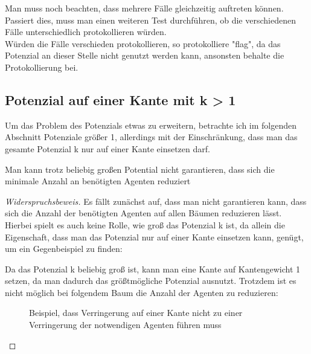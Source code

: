Man muss noch beachten, dass mehrere Fälle gleichzeitig auftreten können. Passiert dies, muss man einen weiteren Test durchführen, ob die verschiedenen Fälle unterschiedlich protokollieren würden.
\\
Würden die Fälle verschieden protokollieren, so protokolliere "flag", da das Potenzial an dieser Stelle nicht genutzt werden kann, ansonsten behalte die Protokollierung bei.

\subsection{Potenzial auf einer Kante mit k > 1}

Um das Problem des Potenzials etwas zu erweitern, betrachte ich im folgenden Abschnitt Potenziale größer 1, allerdings mit der Einschränkung, dass man das gesamte Potenzial k nur auf einer Kante einsetzen darf.

\begin{theorem}
	Man kann trotz beliebig großen Potential nicht garantieren, dass sich die minimale Anzahl an benötigten Agenten reduziert
\end{theorem}

\begin{proof}[Widerspruchsbeweis]
	Es fällt zunächst auf, dass man nicht garantieren kann, dass sich die Anzahl der benötigten Agenten auf allen Bäumen reduzieren lässt. Hierbei spielt es auch keine Rolle, wie groß das Potenzial k ist, da allein die Eigenschaft, dass man das Potenzial nur auf einer Kante einsetzen kann, genügt, um ein Gegenbeispiel zu finden:
	
	Da das Potenzial k beliebig groß ist, kann man eine Kante auf Kantengewicht 1 setzen, da man dadurch das größtmögliche Potenzial ausnutzt. Trotzdem ist es nicht möglich bei folgendem Baum die Anzahl der Agenten zu reduzieren:
	
	\begin{figure}[h]
		\hfill
		\caption{Beispiel, dass Verringerung auf einer Kante nicht zu einer Verringerung der notwendigen Agenten führen muss} 
	\end{figure} 
\end{proof}

